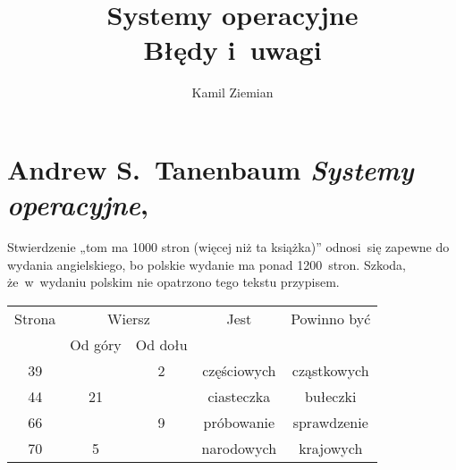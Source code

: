 \documentclass[a4paper,11pt]{article}
\title{Systemy operacyjne \\
  {\Large Błędy i~uwagi}}
\author{Kamil Ziemian}
\numberwithin{equation}{section}
\begin{document}





\maketitle





\section{Andrew S.~Tanenbaum \textit{Systemy operacyjne},
  \cite{Tannenbaum-Systemy-operacyjne-Wydanie-III-2013}}

\label{sec:Tanenbaum-Systemy-operacyjne}




\noindent
{} Stwierdzenie „tom ma 1000 stron (więcej niż ta
książka)” odnosi~się zapewne do wydania angielskiego, bo polskie wydanie ma
ponad 1200~stron. Szkoda, że~w~wydaniu polskim nie opatrzono tego tekstu
przypisem.





\newpage



\begin{center}

  \begin{tabular}{|c|c|c|c|c|}
    \hline
    Strona & \multicolumn{2}{c|}{Wiersz} & Jest
    & Powinno być \\ \cline{2-3}
           & Od góry & Od dołu & & \\
    \hline
    39 & & \hphantom{0}2 & częściowych & cząstkowych \\
    44 & 21 & & ciasteczka & bułeczki \\
    66 & & \hphantom{0}9 & próbowanie & sprawdzenie \\
    70 & \hphantom{0}5 & & narodowych & krajowych \\
    \hline
  \end{tabular}

\end{center}
\end{document}
